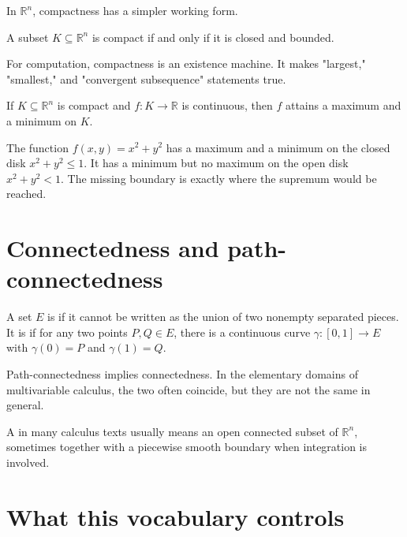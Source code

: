 In \(\mathbb R^n\), compactness has a simpler working form.

\begin{theorem}
A subset \(K\subseteq\mathbb R^n\) is compact if and only if it is closed and bounded.
\end{theorem}

For computation, compactness is an existence machine.  It makes "largest," "smallest," and "convergent subsequence" statements true.

\begin{theorem}
If \(K\subseteq\mathbb R^n\) is compact and \(f:K\to\mathbb R\) is continuous, then \(f\) attains a maximum and a minimum on \(K\).
\end{theorem}

\begin{example}
The function \(f(x,y)=x^2+y^2\) has a maximum and a minimum on the closed disk \(x^2+y^2\le1\).  It has a minimum but no maximum on the open disk \(x^2+y^2<1\).  The missing boundary is exactly where the supremum would be reached.
\end{example}

\section{Connectedness and path-connectedness}

\begin{definition}
A set \(E\) is  if it cannot be written as the union of two nonempty separated pieces.  It is  if for any two points \(P,Q\in E\), there is a continuous curve \(\gamma:[0,1]\to E\) with \(\gamma(0)=P\) and \(\gamma(1)=Q\).
\end{definition}

Path-connectedness implies connectedness.  In the elementary domains of multivariable calculus, the two often coincide, but they are not the same in general.

A  in many calculus texts usually means an open connected subset of \(\mathbb R^n\), sometimes together with a piecewise smooth boundary when integration is involved.

\section{What this vocabulary controls}

